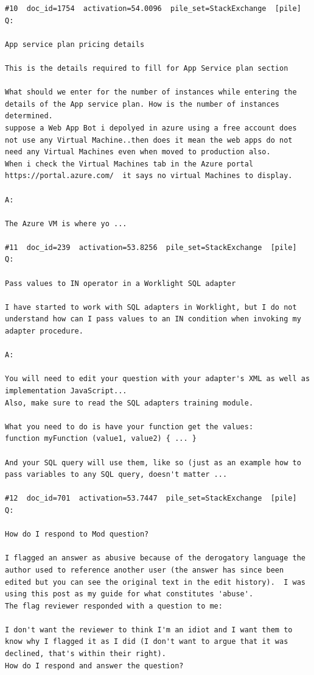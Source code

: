 \begin{verbatim}
#10  doc_id=1754  activation=54.0096  pile_set=StackExchange  [pile]
Q:

App service plan pricing details

This is the details required to fill for App Service plan section

What should we enter for the number of instances while entering the details of the App service plan. How is the number of instances determined.
suppose a Web App Bot i depolyed in azure using a free account does not use any Virtual Machine..then does it mean the web apps do not need any Virtual Machines even when moved to production also.
When i check the Virtual Machines tab in the Azure portal https://portal.azure.com/  it says no virtual Machines to display.

A:

The Azure VM is where yo ...

#11  doc_id=239  activation=53.8256  pile_set=StackExchange  [pile]
Q:

Pass values to IN operator in a Worklight SQL adapter

I have started to work with SQL adapters in Worklight, but I do not understand how can I pass values to an IN condition when invoking my adapter procedure.

A:

You will need to edit your question with your adapter's XML as well as implementation JavaScript...
Also, make sure to read the SQL adapters training module.

What you need to do is have your function get the values:
function myFunction (value1, value2) { ... }

And your SQL query will use them, like so (just as an example how to pass variables to any SQL query, doesn't matter ...

#12  doc_id=701  activation=53.7447  pile_set=StackExchange  [pile]
Q:

How do I respond to Mod question?

I flagged an answer as abusive because of the derogatory language the author used to reference another user (the answer has since been edited but you can see the original text in the edit history).  I was using this post as my guide for what constitutes 'abuse'.
The flag reviewer responded with a question to me:

I don't want the reviewer to think I'm an idiot and I want them to know why I flagged it as I did (I don't want to argue that it was declined, that's within their right).
How do I respond and answer the question?


\end{verbatim}
